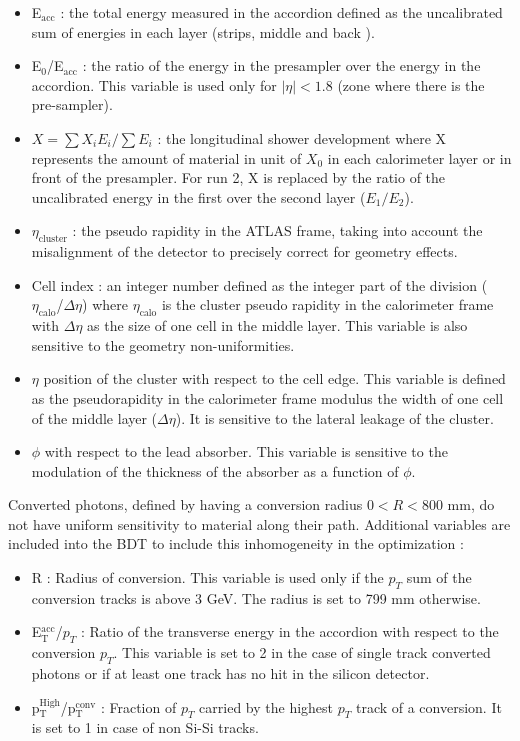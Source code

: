 \begin{itemize}
\item E\(_{\text{acc}}\) : the total energy measured in the accordion defined as the uncalibrated sum of energies in each layer (strips, middle and back ).
\item E\(_{\text{0}}\)/E\(_{\text{acc}}\) : the ratio of the energy in the presampler over the energy in the accordion. This variable is used only for $|\eta|<1.8$ (zone where there is the pre-sampler).
\item \(X=\sum X_iE_i / \sum E_i\) : the longitudinal shower development where X represents the amount of material in unit of $X_0$ in each calorimeter layer or in front of the presampler.
  For run 2, X is replaced by the ratio of the uncalibrated energy in the first over the second layer ($E_1/E_2$).
\item \(\eta_{\text{cluster}}\) : the pseudo rapidity in the ATLAS frame, taking into account the misalignment of the detector to precisely correct for geometry effects.
\item Cell index : an integer number defined as the integer part of the division ( \(\eta_{\text{calo}}\)/\(\Delta \eta\)) where \(\eta_{\text{calo}}\) is the cluster pseudo rapidity in the calorimeter frame with \(\Delta \eta\) as the size of one cell in the middle layer. This variable is also sensitive to the geometry non-uniformities.
\item $\eta$ position of the cluster with respect to the cell edge.
This variable is defined as the pseudorapidity in the calorimeter frame modulus the width of one cell of the middle layer (\(\Delta \eta\)).
It is sensitive to the lateral leakage of the cluster.
\item $\phi$ with respect to the lead absorber. This variable is sensitive to the modulation of the thickness of the absorber as a function of $\phi$.
\end{itemize}


Converted photons, defined by having a conversion radius $0<R<800$ mm,  do not have uniform sensitivity to material along their path.
Additional variables are included into the BDT to include this inhomogeneity in the optimization :


\begin{itemize}
\item R : Radius of conversion. This variable is used only if the $p_T$ sum of the conversion tracks is above 3 GeV. The radius is set to 799 mm otherwise.
\item E\(^{\text{acc}}_{\text{T}}\)/$p_T$ : Ratio of the transverse energy in the accordion with respect to the conversion $p_T$. This variable is set to 2 in the case of single track converted photons or if at least one track has no hit in the silicon detector.
\item p\(_{\text{T}}^{\text{High}}\)/p\(_{\text{T}}^{\text{conv}}\) : Fraction of $p_T$ carried by the highest $p_T$ track of a conversion. It is set to 1 in case of non Si-Si tracks.
\end{itemize}


